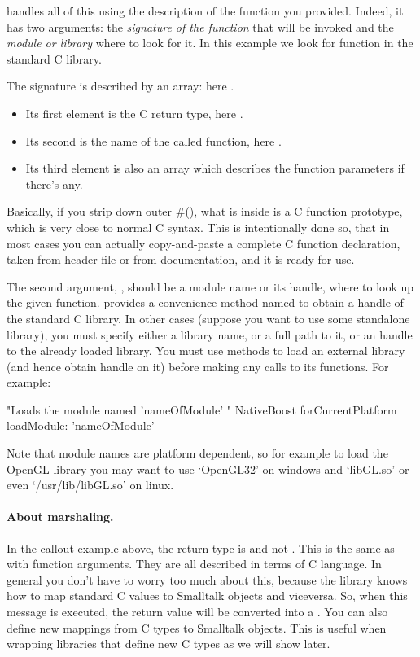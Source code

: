 \documentclass[a4paper,10pt,twoside]{book}
\begin{document}
 handles all of this using the description of the function you provided.
Indeed, it has two arguments: the \emph{signature of the function} that will be invoked and the \emph{module or library} where to look for it.  
In this example we look for  function in the standard C library. 

The signature is described by an array: here .
\begin{itemize} 
\item Its first element is the C return type, here .
\item Its second is the name of the called function, here .
\item Its third element is also an array which describes the function parameters if there's any. 
\end{itemize}

Basically, if you strip down outer \#(), what is inside is a C function prototype, which is very close to normal C syntax. 
This is intentionally done so, that in most cases you can actually copy-and-paste a complete C function declaration, taken from header file or from documentation, and it is ready for use.

The second argument, , should be a module name or its handle, where to look up the given function.
\NativeBoost provides a convenience method named  to obtain a handle of the standard C library. 
In other cases (suppose you want to use some standalone library), you must specify either a library name, or a full path to it, or an handle to the already loaded library.
You must use \NativeBoost methods to load an external library (and hence obtain handle on it) before making any calls to its functions. For example:

\begin{code}{}
"Loads the module named 'nameOfModule' "
NativeBoost forCurrentPlatform loadModule: 'nameOfModule'
\end{code}

Note that module names are platform dependent, so for example to load the OpenGL library you may want to use `OpenGL32' on windows and `libGL.so' or even  `/usr/lib/libGL.so' on linux.


\paragraph{About marshaling.} In the  callout example above, the return type is  and not . This is the same as with function arguments. They are all described in terms of C language. In general you don't have to worry too much about this, because the \NativeBoost library knows how to map standard C values to Smalltalk objects and viceversa. So, when this message is executed, the return value will be converted into a . 
You can also define new mappings from C types to Smalltalk objects. 
This is useful when wrapping libraries that define new C types as we will show later. 
\end{document}
